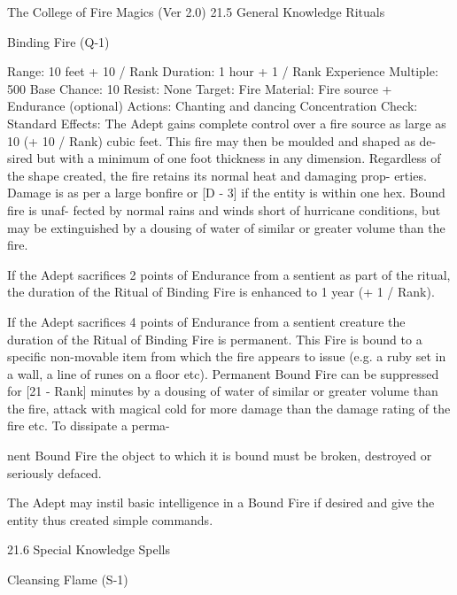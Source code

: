 \begin{Chapter}{The College of Fire Magics (Ver 2.0)}
21.5 General Knowledge Rituals 

Binding Fire (Q-1) 

Range: 10 feet + 10 / Rank 
Duration: 1 hour + 1 / Rank 
Experience Multiple: 500 
Base Chance: 10%
Resist: None 
Target: Fire 
Material: Fire source + Endurance (optional) 
Actions: Chanting and dancing 
Concentration Check: Standard 
Effects:  The  Adept  gains  complete  control  over  a 
fire source as large as 10 (+ 10 / Rank) cubic feet. 
This  fire  may  then  be  moulded  and  shaped  as  de-
sired but with a minimum of one foot thickness in 
any  dimension.  Regardless  of  the  shape  created, 
the fire retains its normal heat and damaging prop-
erties. Damage is as per a large bonfire or [D - 3] if 
the  entity  is  within  one  hex.  Bound  fire  is  unaf-
fected by normal rains and winds short of hurricane 
conditions,  but  may  be  extinguished  by  a  dousing 
of water of similar or greater volume than the fire. 

If the Adept sacrifices 2 points of Endurance from 
a  sentient  as  part  of  the  ritual,  the  duration  of  the 
Ritual of Binding Fire is enhanced to 1 year (+ 1 / 
Rank). 

If the Adept sacrifices 4 points of Endurance from 
a  sentient  creature  the  duration  of  the  Ritual  of 
Binding Fire is permanent. This Fire  is bound to a 
specific  non-movable  item  from  which  the  fire 
appears to issue (e.g. a ruby set in a wall, a line of 
runes on a floor etc). Permanent Bound Fire can be 
suppressed for [21 - Rank] minutes by a dousing of 
water  of  similar  or  greater  volume  than  the  fire, 
attack with magical cold for more damage than the 
damage rating of the fire etc. To dissipate a perma-

nent  Bound  Fire  the  object  to  which  it  is  bound 
must be broken, destroyed or seriously defaced. 

The Adept may instil basic intelligence in a Bound 
Fire  if  desired  and  give  the  entity  thus  created 
simple commands. 

21.6 Special Knowledge Spells 

Cleansing Flame (S-1) 


\end{Chapter}
